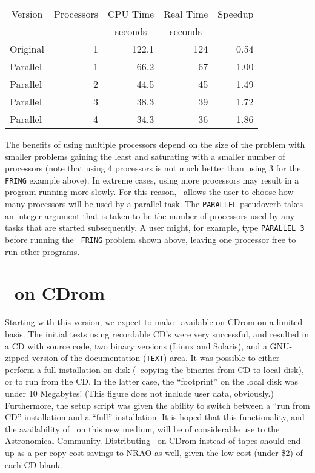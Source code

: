 \begin{tabular}{|l|r|r|r|r|}
\hline
\multicolumn{1}{|c|}{Version} & \multicolumn{1}{c|}{Processors}
  & \multicolumn{1}{c|}{CPU Time} & \multicolumn{1}{c|}{Real Time}
  & \multicolumn{1}{c|}{Speedup} \\
  &  &  \multicolumn{1}{c|}{seconds} & \multicolumn{1}{c}{seconds} & \\
\hline
Original & 1 & 122.1 & 124 & 0.54 \\
Parallel & 1 &  66.2 &  67 & 1.00 \\
Parallel & 2 &  44.5 &  45 & 1.49 \\
Parallel & 3 &  38.3 &  39 & 1.72 \\
Parallel & 4 &  34.3 &  36 & 1.86 \\
\hline
\end{tabular}

The benefits of using multiple processors depend on the size of the
problem with smaller problems gaining the least and saturating with a
smaller number of processors (note that using 4 processors is not much
better than using 3 for the {\tt FRING} example above).  In extreme
cases, using more processors may result in a program running more
slowly.  For this reason, \AIPS\ allows the user to choose how many
processors will be used by a parallel task.  The {\tt PARALLEL}
pseudoverb takes an integer argument that is taken to be the number of
processors used by any tasks that are started subsequently.  A user
might, for example, type {\tt PARALLEL 3} before running the {\tt
FRING} problem shown above, leaving one processor free to run other
programs.

\section{\AIPS\ on CDrom}

Starting with this version, we expect to make \AIPS\ available on CDrom
on a limited basis.  The initial tests using recordable CD's were very
successful, and resulted in a CD with source code, two binary versions
(Linux and Solaris), and a GNU-zipped version of the documentation
({\tt TEXT}) area.  It was possible to either perform a full
installation on disk (\ie\ copying the binaries from CD to local
disk), or to run from the \hbox{CD}.  In the latter case, the
``footprint'' on the local disk was under 10 Megabytes!  (This figure
does not include user data, obviously.)  Furthermore, the setup script
was given the ability to switch between a ``run from CD'' installation
and a ``full'' installation.  It is hoped that this functionality, and
the availability of \AIPS\ on this new medium, will be of considerable
use to the Astronomical Community.  Distributing \AIPS\ on CDrom
instead of tapes should end up as a per copy cost savings to NRAO as
well, given the low cost (under \$2) of each CD blank.
\eject


